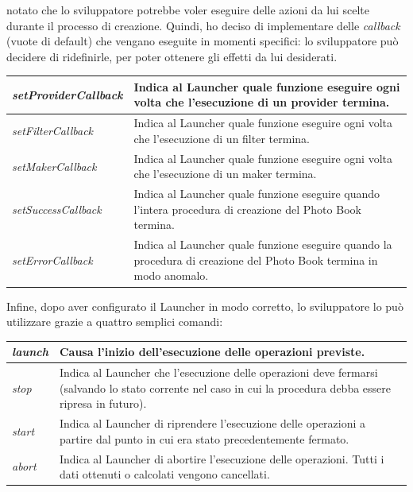 				notato che lo sviluppatore potrebbe voler eseguire delle azioni da lui scelte durante il processo di creazione.
				Quindi, ho deciso di implementare delle \emph{callback} (vuote di default) che vengano eseguite in momenti specifici:
				lo sviluppatore può decidere di ridefinirle, per poter ottenere gli effetti da lui desiderati.
				\begin{center}
					\begin{tabular}[H]{p{} p{}}
						\emph{setProviderCallback}	& Indica al Launcher quale funzione eseguire ogni volta che
										  l'esecuzione di un provider termina.\\
						\hline
						\emph{setFilterCallback}	& Indica al Launcher quale funzione eseguire ogni volta che
										  l'esecuzione di un filter termina.\\
						\hline
						\emph{setMakerCallback}		& Indica al Launcher quale funzione eseguire ogni volta che
										  l'esecuzione di un maker termina.\\
						\hline
						\emph{setSuccessCallback}	& Indica al Launcher quale funzione eseguire quando l'intera
										  procedura di creazione del Photo Book termina.\\
						\hline
						\emph{setErrorCallback}		& Indica al Launcher quale funzione eseguire quando la procedura di
										  creazione del Photo Book termina in modo anomalo.\\
					\end{tabular}
				\end{center}
				Infine, dopo aver configurato il Launcher in modo corretto, lo sviluppatore lo può utilizzare grazie a quattro
				semplici comandi:
				\begin{center}
					\begin{tabular}[H]{p{} p{}}
						\emph{launch}			& Causa l'inizio dell'esecuzione delle operazioni previste.\\
						\hline
						\emph{stop}			& Indica al Launcher che l'esecuzione delle operazioni deve fermarsi
										  (salvando lo stato corrente nel caso in cui la procedura debba
										  essere ripresa in futuro).\\
						\hline
						\emph{start}			& Indica al Launcher di riprendere l'esecuzione delle operazioni a
										  partire dal punto in cui era stato precedentemente fermato.\\
						\hline
						\emph{abort}			& Indica al Launcher di abortire l'esecuzione delle operazioni. Tutti
										  i dati ottenuti o calcolati vengono cancellati.\\
					\end{tabular}
				\end{center}
